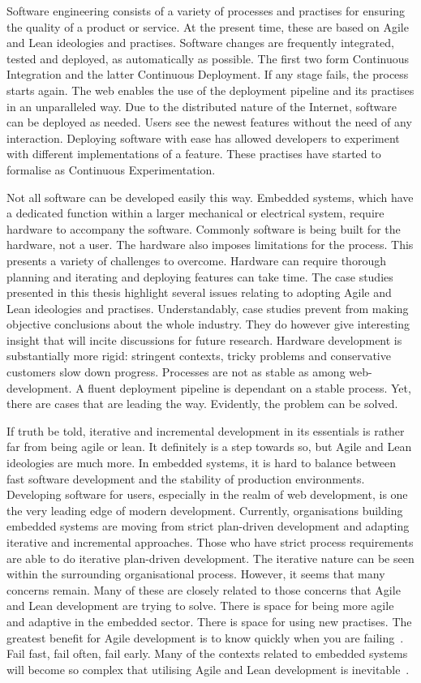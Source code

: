 \documentclass[english]{tktltiki2}
\begin{document}
Software engineering consists of a variety of processes and practises for ensuring the quality of a product or service. At the present time, these are based on Agile and Lean ideologies and practises. Software changes are frequently integrated, tested and deployed, as automatically as possible. The first two form Continuous Integration and the latter Continuous Deployment. If any stage fails, the process starts again. The web enables the use of the deployment pipeline and its practises in an unparalleled way. Due to the distributed nature of the Internet, software can be deployed as needed. Users see the newest features without the need of any interaction. Deploying software with ease has allowed developers to experiment with different implementations of a feature. These practises have started to formalise as Continuous Experimentation.

Not all software can be developed easily this way. Embedded systems, which have a dedicated function within a larger mechanical or electrical system, require hardware to accompany the software. Commonly software is being built for the hardware, not a user. The hardware also imposes limitations for the process. This presents a variety of challenges to overcome. Hardware can require thorough planning and iterating and deploying features can take time. The case studies presented in this thesis highlight several issues relating to adopting Agile and Lean ideologies and practises. Understandably, case studies prevent from making objective conclusions about the whole industry. They do however give interesting insight that will incite discussions for future research. Hardware development is substantially more rigid: stringent contexts, tricky problems and conservative customers slow down progress. Processes are not as stable as among web-development. A fluent deployment pipeline is dependant on a stable process. Yet, there are cases that are leading the way. Evidently, the problem can be solved.

If truth be told, iterative and incremental development in its essentials is rather far from being agile or lean. It definitely is a step towards so, but Agile and Lean ideologies are much more. In embedded systems, it is hard to balance between fast software development and the stability of production environments. Developing software for users, especially in the realm of web development, is one the very leading edge of modern development. Currently, organisations building embedded systems are moving from strict plan-driven development and adapting iterative and incremental approaches. Those who have strict process requirements are able to do iterative plan-driven development. The iterative nature can be seen within the surrounding organisational process. However, it seems that many concerns remain. Many of these are closely related to those concerns that Agile and Lean development are trying to solve. There is space for being more agile and adaptive in the embedded sector. There is space for using new practises. The greatest benefit for Agile development is to know quickly when you are failing~\cite{Hol15a}. Fail fast, fail often, fail early. Many of the contexts related to embedded systems will become so complex that utilising Agile and Lean development is inevitable~\cite{Hol15a}.
\end{document}

